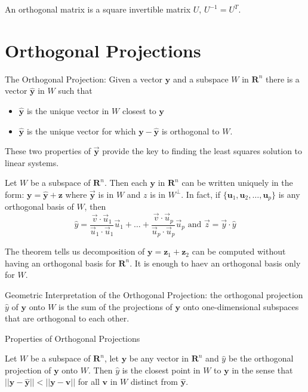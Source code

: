 \documentclass[../linalg.tex]{subfiles}
\begin{document}
An orthogonal matrix is a square invertible matrix $U$, $U^{-1}=U^T$.
\section{Orthogonal Projections}
The Orthogonal Projection: Given a vector $\textbf{y}$ and a subspace $W$ in $\textbf{R}^n$ there is a vector $\hat{\textbf{y}}$ in $W$ such that 
\begin{itemize}
    \item $\hat{\textbf{y}}$ is the unique vector in $W$ closest to $\textbf{y}$
    \item $\hat{\textbf{y}}$ is the unique vector for which $\textbf{y}-\hat{\textbf{y}}$ is orthogonal to $W$.
\end{itemize}
These two properties of $\vec{\textbf{y}}$ provide the key to finding the least squares solution to linear systems.

\begin{theorem}
    Let $W$ be a subspace of $\textbf{R}^n$. Then each $\textbf{y}$ in $\textbf{R}^n$ can be written uniquely in the form: $\textbf{y}=\hat{\textbf{y}}+\textbf{z}$ where $\vec{\textbf{y}}$ is in $W$ and $z$ is in $W^{\perp}$.
    In fact, if $\{\textbf{u}_1,\textbf{u}_2,\dots,\textbf{u}_p\}$ is any orthogonal basis of $W$, then 
    \[ \hat{y}=\frac{\vec{v}\cdot \vec{u}_1}{\vec{u}_1\cdot \vec{u}_1}\vec{u}_1+\dots+\frac{\vec{v}\cdot \vec{u}_p}{\vec{u}_p\cdot \vec{u}_p}\vec{u}_p \text{ and } \vec{z}=\vec{y}\cdot\hat{y} \]
\end{theorem}
The theorem tells us decomposition of $\textbf{y}=\textbf{z}_1+\textbf{z}_2$ can be computed without having an orthogonal basis for $\textbf{R}^n$. It is enough to haev an orthogonal basis only for $W$.

Geometric Interpretation of the Orthogonal Projection: the orthogonal projection $\hat{y}$ of $\textbf{y}$ onto $W$ is the sum of the projections of $\textbf{y}$ onto one-dimensional subspaces that are orthogonal to each other.

Properties of Orthogonal Projections 
\begin{theorem}
    Let $W$ be a subspace of $\textbf{R}^n$, let $\textbf{y}$ be any vector in $\textbf{R}^n$ and $\hat{y}$ be the orthogonal projection of $\textbf{y}$ onto $W$.
    Then $\hat{y}$ is the closest point in $W$ to $\textbf{y}$ in the sense that $||\textbf{y}-\hat{\textbf{y}}||<||\textbf{y}-\textbf{v}||$ for all $\textbf{v}$ in $W$ distinct from $\hat{\textbf{y}}$.
\end{theorem}
\end{document}
